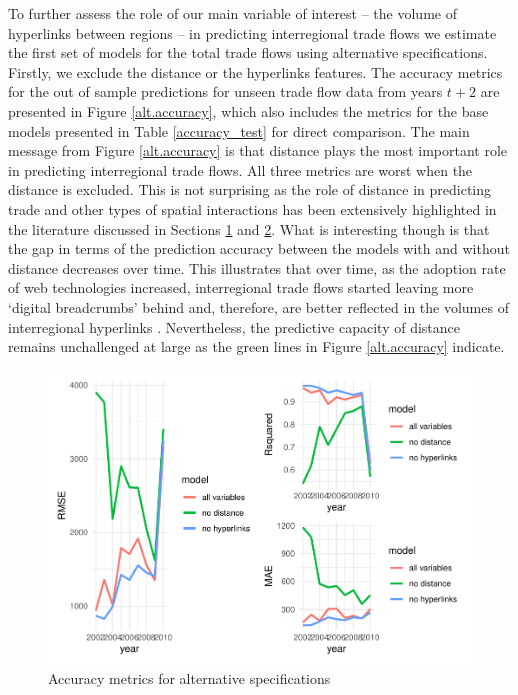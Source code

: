 \documentclass[]{interact}
\theoremstyle{plain}%
\theoremstyle{definition}
\theoremstyle{remark}
\begin{document}
To further assess the role of our main variable of interest -- the
volume of hyperlinks between regions -- in predicting interregional
trade flows we estimate the first set of models for the total trade
flows using alternative specifications. Firstly, we exclude the distance
or the hyperlinks features. The accuracy metrics for the out of sample
predictions for unseen trade flow data from years \(t + 2\) are
presented in Figure \ref{alt.accuracy}, which also includes the metrics
for the base models presented in Table \ref{accuracy_test} for direct
comparison. The main message from Figure \ref{alt.accuracy} is that
distance plays the most important role in predicting interregional trade
flows. All three metrics are worst when the distance is excluded. This
is not surprising as the role of distance in predicting trade and other
types of spatial interactions has been extensively highlighted in the
literature discussed in Sections \protect\hyperlink{sec:1}{1} and
\protect\hyperlink{sec:2}{2}. What is interesting though is that the gap
in terms of the prediction accuracy between the models with and without
distance decreases over time. This illustrates that over time, as the
adoption rate of web technologies increased, interregional trade flows
started leaving more `digital breadcrumbs' behind and, therefore, are
better reflected in the volumes of interregional hyperlinks
\citep{rabari_storper2014}. Nevertheless, the predictive capacity of
distance remains unchallenged at large as the green lines in Figure
\ref{alt.accuracy} indicate.

\begin{figure}[p]
\includegraphics[width=1\linewidth]{hl_files/figure-latex/unnamed-chunk-11-1} \caption{\label{alt.accuracy}Accuracy metrics for alternative specifications}\label{fig:unnamed-chunk-11}
\end{figure}
\end{document}

